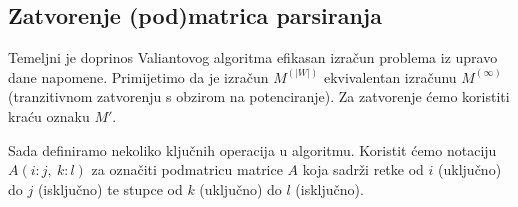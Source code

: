 \documentclass[a4paper,oneside,12pt]{article} %
\begin{document}
    
    \subsection{Zatvorenje (pod)matrica parsiranja}
    
    Temeljni je doprinos Valiantovog algoritma efikasan izračun 
        problema iz upravo dane napomene.
    Primijetimo da je izračun $M^{(|W|)}$ ekvivalentan izračunu
        $M^{(\infty)}$ (tranzitivnom zatvorenju s obzirom na potenciranje).
    Za zatvorenje ćemo koristiti kraću oznaku $M'$.
    
    Sada definiramo nekoliko ključnih operacija u algoritmu.
    Koristit ćemo notaciju $A(i:j,\ k:l)$ za označiti
        podmatricu matrice $A$ koja sadrži retke od $i$ (uključno) do $j$ (isključno)
        te stupce od $k$ (uključno) do $l$ (isključno).
        
\end{document}
